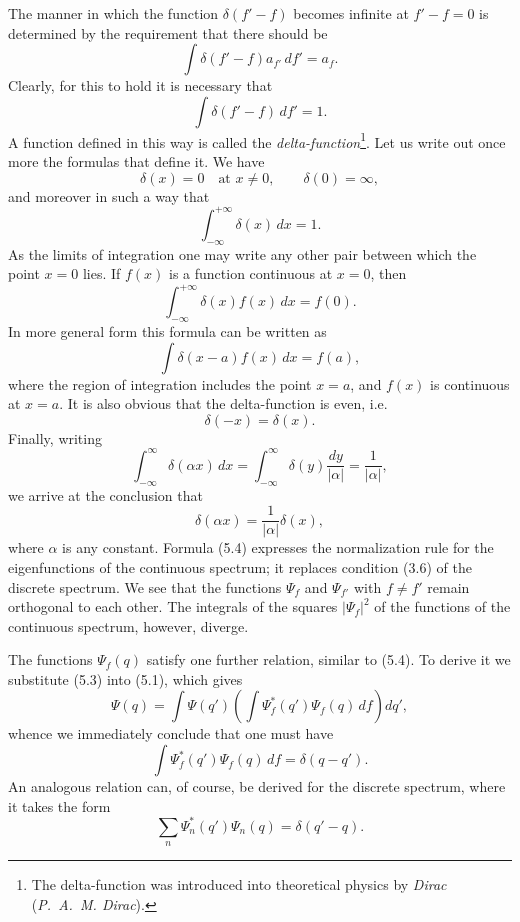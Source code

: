 The manner in which the function $\delta(f'-f)$ becomes infinite at
$f'-f=0$ is determined by the requirement that there should be
\[
  \int\delta(f'-f)a_{f'}\,df'=a_f.
\]
Clearly, for this to hold it is necessary that
\[
  \int\delta(f'-f)\,df'=1.
\]
A function defined in this way is called the
\textit{delta-function}\footnote{The delta-function was introduced into
theoretical physics by \textit{Dirac} (\textit{P.~A.~M. Dirac}).}. Let us write
out once more the formulas that define it. We have
\begin{equation}
  \delta(x)=0\quad\text{at }x\ne0,\qquad \delta(0)=\infty,
  \tag{5.5}
\end{equation}
and moreover in such a way that
\begin{equation}
  \int_{-\infty}^{+\infty}\delta(x)\,dx=1.
  \tag{5.6}
\end{equation}
As the limits of integration one may write any other pair between which the
point $x=0$ lies. If $f(x)$ is a function continuous at $x=0$, then
\begin{equation}
  \int_{-\infty}^{+\infty}\delta(x)f(x)\,dx=f(0).
  \tag{5.7}
\end{equation}
In more general form this formula can be written as
\begin{equation}
  \int\delta(x-a)f(x)\,dx=f(a),
  \tag{5.8}
\end{equation}
where the region of integration includes the point $x=a$, and $f(x)$ is
continuous at $x=a$. It is also obvious that the delta-function is even, i.e.
\begin{equation}
  \delta(-x)=\delta(x).
  \tag{5.9}
\end{equation}
Finally, writing
\[
  \int_{-\infty}^{\infty}\delta(\alpha x)\,dx
  =\int_{-\infty}^{\infty}\delta(y)\frac{dy}{|\alpha|}
  =\frac{1}{|\alpha|},
\]
we arrive at the conclusion that
\begin{equation}
  \delta(\alpha x)=\frac{1}{|\alpha|}\delta(x),
  \tag{5.10}
\end{equation}
where $\alpha$ is any constant.
Formula (5.4) expresses the normalization rule for the eigenfunctions of the
continuous spectrum; it replaces condition (3.6) of the discrete spectrum. We
see that the functions $\Psi_f$ and $\Psi_{f'}$ with $f\ne f'$ remain
orthogonal to each other. The integrals of the squares $|\Psi_f|^2$ of the
functions of the continuous spectrum, however, diverge.

The functions $\Psi_f(q)$ satisfy one further relation, similar to (5.4). To
derive it we substitute (5.3) into (5.1), which gives
\[
  \Psi(q)=\int\Psi(q')
  \left(\int\Psi_f^*(q')\Psi_f(q)\,df\right)dq',
\]
whence we immediately conclude that one must have
\begin{equation}
  \int\Psi_f^*(q')\Psi_f(q)\,df=\delta(q-q').
  \tag{5.11}
\end{equation}
An analogous relation can, of course, be derived for the discrete spectrum,
where it takes the form
\begin{equation}
  \sum_n\Psi_n^*(q')\Psi_n(q)=\delta(q'-q).
  \tag{5.12}
\end{equation}

